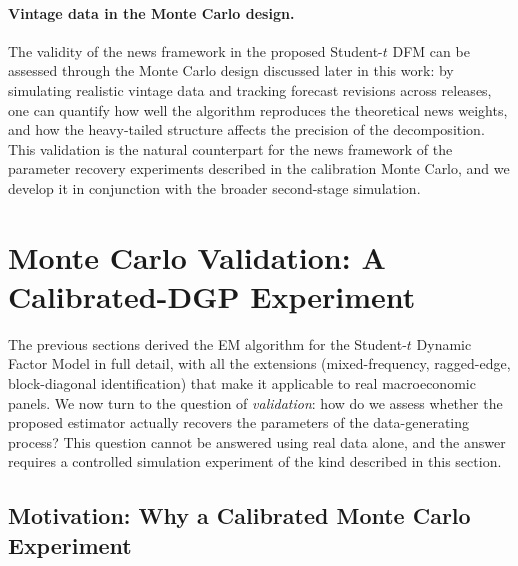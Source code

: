 \documentclass[11pt, a4paper, oneside]{article}
\begin{document}
\paragraph{Vintage data in the Monte Carlo design.}
The validity of the news framework in the proposed Student-$t$ DFM
can be assessed through the Monte Carlo design discussed later
in this work: by simulating realistic vintage data and tracking
forecast revisions across releases, one can quantify how well the
algorithm reproduces the theoretical news weights, and how the
heavy-tailed structure affects the precision of the decomposition.
This validation is the natural counterpart for the news framework
of the parameter recovery experiments described in the calibration
Monte Carlo, and we develop it in conjunction with the broader
second-stage simulation.


\newpage

\section{Monte Carlo Validation: A Calibrated-DGP Experiment}
\label{sec:monte-carlo}

The previous sections derived the EM algorithm for the Student-$t$
Dynamic Factor Model in full detail, with all the extensions
(mixed-frequency, ragged-edge, block-diagonal identification) that
make it applicable to real macroeconomic panels. We now turn to the
question of \emph{validation}: how do we assess whether the proposed
estimator actually recovers the parameters of the data-generating
process? This question cannot be answered using real data alone, and
the answer requires a controlled simulation experiment of the kind
described in this section.

\subsection{Motivation: Why a Calibrated Monte Carlo Experiment}
\label{subsec:mc-motivation}
\end{document}
